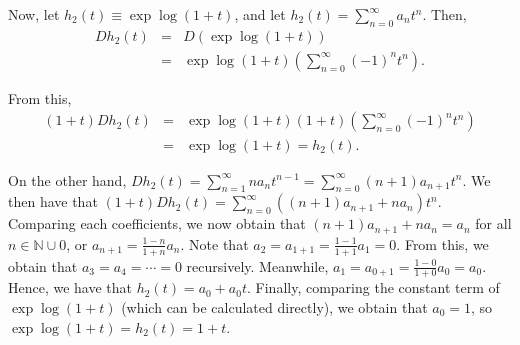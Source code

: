 \documentclass{article}
\begin{document}
Now, let $h_2(t) \equiv \exp{\log{(1 + t)}}$, and let $h_2(t) = \sum_{n = 0}^\infty a_n t^n$.
Then, 
\begin{eqnarray*}
  Dh_2(t) &=& D(\exp{\log{(1 + t)}}) \\ 
    &=& \exp{\log{(1 + t)}} \left( \sum_{n = 0}^\infty (-1)^n t^n \right).
\end{eqnarray*}

From this,  
\begin{eqnarray*}
  (1 + t) Dh_2(t) &=& \exp{\log{(1 + t)}} (1 + t) \left( \sum_{n = 0}^\infty (-1)^n t^n \right) \\ 
    &=& \exp{\log{(1 + t)}} = h_2(t).
\end{eqnarray*}

On the other hand, $Dh_2(t) = \sum_{n = 1}^\infty na_n t^{n - 1} = \sum_{n = 0}^\infty (n + 1) a_{n + 1} t^n$.
We then have that $(1 + t) Dh_2(t) = \sum_{n = 0}^\infty ((n + 1) a_{n + 1} + na_n) t^n$.
Comparing each coefficients, we now obtain that $(n + 1) a_{n + 1} + na_n = a_n$ for all $n \in \mathbb{N} \cup {0}$, or $a_{n + 1} = \frac{1 - n}{1 + n} a_n$.
Note that $a_2 = a_{1 + 1} = \frac{1 - 1}{1 + 1} a_1 = 0$.
From this, we obtain that $a_3 = a_4 = \cdots = 0$ recursively.
Meanwhile, $a_1 = a_{0 + 1} = \frac{1 - 0}{1 + 0} a_0 = a_0$.
Hence, we have that $h_2(t) = a_0 + a_0 t$.
Finally, comparing the constant term of $\exp{\log{(1 + t)}}$ (which can be calculated directly), we obtain that $a_0 = 1$, so $\exp{\log{(1 + t)}} = h_2(t) = 1 + t$.
\end{document}
